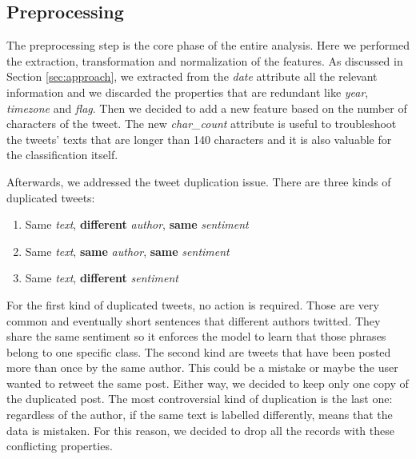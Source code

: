 \documentclass[conference]{IEEEtran}
\begin{document}
\subsection{Preprocessing}\label{sec:preprocessing}
The preprocessing step is the core phase of the entire analysis. Here we performed the extraction, transformation and normalization of the features. As discussed in Section \ref{sec:approach}, we extracted from the \textit{date} attribute all the relevant information and we discarded the properties that are redundant like \textit{year}, \textit{timezone} and \textit{flag}. Then we decided to add a new feature based on the number of characters of the tweet. The new \textit{char\_count} attribute is useful to troubleshoot the tweets' texts that are longer than 140 characters and it is also valuable for the classification itself.

Afterwards, we addressed the tweet duplication issue. There are three kinds of duplicated tweets:
\begin{enumerate}
    \item Same \textit{text}, \textbf{different} \textit{author}, \textbf{same} \textit{sentiment}
    \item Same \textit{text}, \textbf{same} \textit{author}, \textbf{same} \textit{sentiment}
    \item Same \textit{text}, \textbf{different} \textit{sentiment}
\end{enumerate}
For the first kind of duplicated tweets, no action is required. Those are very common and eventually short sentences that different authors twitted. They share the same sentiment so it enforces the model to learn that those phrases belong to one specific class. The second kind are tweets that have been posted more than once by the same author. This could be a mistake or maybe the user wanted to retweet the same post. Either way, we decided to keep only one copy of the duplicated post. The most controversial kind of duplication is the last one: regardless of the author, if the same text is labelled differently, means that the data is mistaken.
For this reason, we decided to drop all the records with these conflicting properties.
\end{document}
